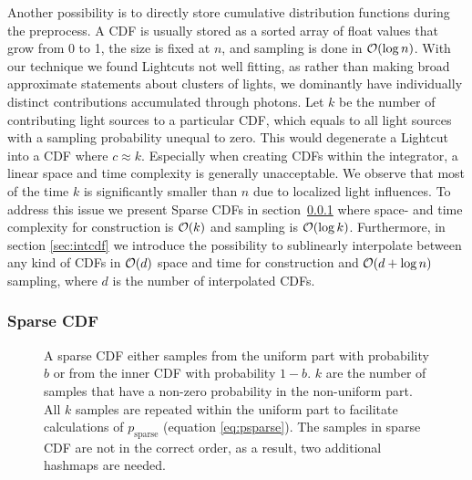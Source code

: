 Another possibility is to directly store cumulative distribution functions during the preprocess. A CDF is usually stored as a sorted array of float values that grow from 0 to 1, the size is fixed at $n$, and sampling is done in $\mathcal{O}(\log{n})$. With our technique we found Lightcuts not well fitting, as rather than making broad approximate statements about clusters of lights, we dominantly have individually distinct contributions accumulated through photons. Let $k$ be the number of contributing light sources to a particular CDF, which equals to all light sources with a sampling probability unequal to zero. This would degenerate a Lightcut into a CDF where $c \approx k$. Especially when creating CDFs within the integrator, a linear space and time complexity is generally unacceptable. We observe that most of the time $k$ is significantly smaller than $n$ due to localized light influences. To address this issue we present Sparse CDFs in section~\ref{sec:sparse} where space- and time complexity for construction is $\mathcal{O}(k)$ and sampling is $\mathcal{O}(\log{k})$. Furthermore, in section \ref{sec:intcdf} we introduce the possibility to sublinearly interpolate between any kind of CDFs in $\mathcal{O}(d)$ space and time for construction and $\mathcal{O}(d + \log{n})$ sampling, where $d$ is the number of interpolated CDFs.

\subsubsection{Sparse CDF}
\label{sec:sparse}
\begin{figure}[htb] 
	\centering
    
    \caption{A sparse CDF either samples from the uniform part with probability $b$ or from the inner CDF with probability $1-b$. $k$ are the number of samples that have a non-zero probability in the non-uniform part. All $k$ samples are repeated within the uniform part to facilitate calculations of $p_{\text{sparse}}$ (equation \ref{eq:psparse}). The samples in sparse CDF are not in the correct order, as a result, two additional hashmaps are needed.} 
    \label{fig:sparseCDF}
\end{figure}

